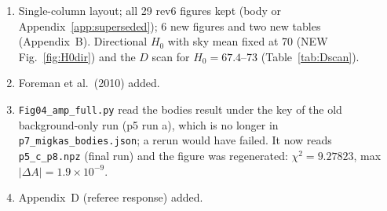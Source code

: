 \documentclass[11pt]{article}
\begin{document}
\begin{enumerate}
\item Single-column layout; all 29 rev6 figures kept (body or Appendix~\ref{app:superseded}); 6 new figures and two new tables (Appendix~B). Directional $H_0$ with sky mean fixed at 70 (NEW Fig.~\ref{fig:H0dir}) and the $D$ scan for $H_0=67.4$--73 (Table~\ref{tab:Dscan}).
\item Foreman et al.\ (2010) added.
\item \texttt{Fig04\_amp\_full.py} read the bodies result under the key of the old background-only run (p5 run a), which is no longer in \texttt{p7\_migkas\_bodies.json}; a rerun would have failed. It now reads \texttt{p5\_c\_p8.npz} (final run) and the figure was regenerated: $\chi^2=9.27823$, max$|\Delta A|=1.9\times10^{-9}$.
\item Appendix~D (referee response) added.
\end{enumerate}
\end{document}
